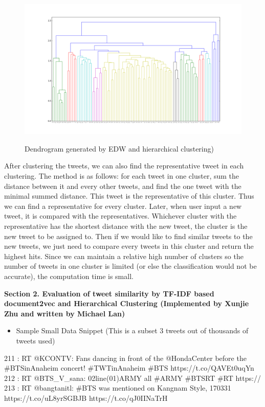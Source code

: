 \documentclass[10pt]{article}
\begin{document}
\begin{itemize}
\begin{figure}[H]
	\caption{Dendrogram generated by EDW and hierarchical clustering)}
	\centering
	\includegraphics[scale=0.3]{figure_1_hcluster.png}
	\label{fig1}
\end{figure}


After clustering the tweets, we can also find the representative tweet in each clustering. The method is as follows: for each tweet in one cluster, sum the distance between it and every other tweets, and find the one tweet with the minimal summed distance. This tweet is the representative of this cluster. Thus we can find a representative for every cluster. Later, when user input a new tweet, it is compared with the representatives. Whichever cluster with the representative has the shortest distance with the new tweet, the cluster is the new tweet to be assigned to. Then if we would like to find similar tweets to the new tweets, we just need to compare every tweets in this cluster and return the highest hits. Since we can maintain a relative high number of clusters so the number of tweets in one cluster is limited (or else the classification would not be accurate), the computation time is small.        

\end{itemize}
{\bf Section 2. Evaluation of tweet similarity by TF-IDF based document2vec and Hierarchical Clustering (Implemented by Xunjie Zhu and written by Michael Lan) }

\begin{itemize}
	\item Sample Small Data Snippet (This is a subset 3 tweets out of thousands of tweets used)
\end{itemize}
211 : RT @KCONTV: Fans dancing in front of the @HondaCenter before the \#BTSinAnaheim concert! \#TWTinAnaheim \#BTS https://t.co/QAVEt0uqYn
212 : RT @BTS\_V\_sana:   02line(01)ARMY  all    \#ARMY  \#BTSRT  \#RT https://
213 : RT @bangtanitl: \#BTS was mentioned on Kangnam Style, 170331 https://t.co/uL8yrSGBJB https://t.co/qJ0IINaTrH
\end{document}
